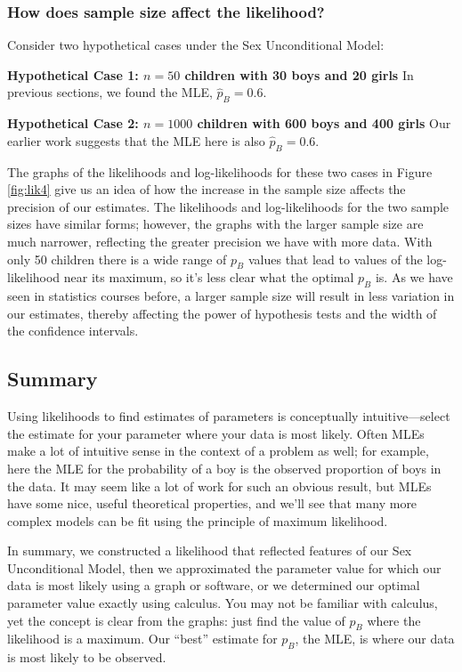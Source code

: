 \documentclass[
]{krantz}
\begin{document}
\hypertarget{how-does-sample-size-affect-the-likelihood}{%
\subsubsection{How does sample size affect the likelihood?}\label{how-does-sample-size-affect-the-likelihood}}

Consider two hypothetical cases under the Sex Unconditional Model:

\textbf{Hypothetical Case 1: \(n = 50\) children with 30 boys and 20 girls} In previous sections, we found the MLE, \(\hat{p}_B=0.6.\)

\textbf{Hypothetical Case 2: \(n = 1000\) children with 600 boys and 400 girls} Our earlier work suggests that the MLE here is also \(\hat{p}_B=0.6.\)

The graphs of the likelihoods and log-likelihoods for these two cases in Figure \ref{fig:lik4} give us an idea of how the increase in the sample size affects the precision of our estimates. The likelihoods and log-likelihoods for the two sample sizes have similar forms; however, the graphs with the larger sample size are much narrower, reflecting the greater precision we have with more data. With only 50 children there is a wide range of \(p_B\) values that lead to values of the log-likelihood near its maximum, so it's less clear what the optimal \(p_B\) is. As we have seen in statistics courses before, a larger sample size will result in less variation in our estimates, thereby affecting the power of hypothesis tests and the width of the confidence intervals.

\hypertarget{summary}{%
\subsection{Summary}\label{summary}}

Using likelihoods to find estimates of parameters is conceptually intuitive---select the estimate for your parameter where your data is most likely. Often MLEs make a lot of intuitive sense in the context of a problem as well; for example, here the MLE for the probability of a boy is the observed proportion of boys in the data. It may seem like a lot of work for such an obvious result, but MLEs have some nice, useful theoretical properties, and we'll see that many more complex models can be fit using the principle of maximum likelihood.

In summary, we constructed a likelihood that reflected features of our Sex Unconditional Model, then we approximated the parameter value for which our data is most likely using a graph or software, or we determined our optimal parameter value exactly using calculus. You may not be familiar with calculus, yet the concept is clear from the graphs: just find the value of \(p_B\) where the likelihood is a maximum. Our ``best'' estimate for \(p_B\), the MLE, is where our data is most likely to be observed.
\end{document}
